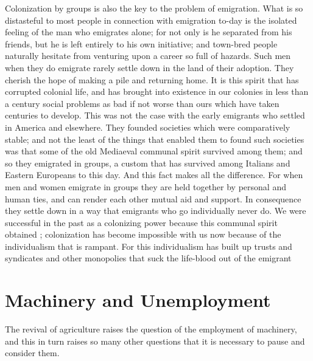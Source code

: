 \documentclass{book}
\begin{document}
Colonization by groups is also the key to the problem of emigration. What is so distasteful to most people in connection with emigration to-day is the isolated feeling of the man who emigrates alone; for not only is he separated from his friends, but he is left entirely to his own initiative; and town-bred people naturally hesitate from venturing upon a career so full of hazards. Such men when they do emigrate rarely settle down in the land of their adoption. They cherish the hope of making a pile and returning home. It is this spirit that has corrupted colonial life, and has brought into existence in our colonies in less than a century social problems as bad if not worse than ours which have taken centuries to develop. This was not the case with the early emigrants who settled in America and elsewhere. They founded societies which were comparatively stable; and not the least of the things that enabled them to found such societies was that some of the old Mediaeval communal spirit survived among them; and so they emigrated in groups, a custom that has survived among Italians and Eastern Europeans to this day. And this fact makes all the difference. For when men and women emigrate in groups they are held together by personal and human ties, and can render each other mutual aid and support. In consequence they settle down in a way that emigrants who go individually never do. We were successful in the past as a colonizing power because this communal spirit obtained ; colonization has become impossible with us now because of the individualism that is rampant. For this individualism has built up trusts and syndicates and other monopolies that suck the life-blood out of the emigrant

\chapter{Machinery and Unemployment}
\label{chapter-10}
The revival of agriculture raises the question of the employment of machinery, and this in turn raises so many other questions that it is necessary to pause and consider them.
\end{document}
